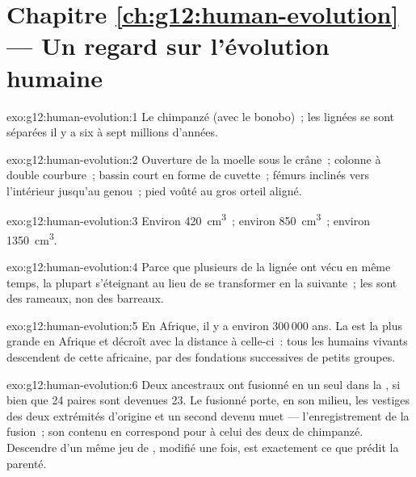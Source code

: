 \section*{Chapitre \ref{ch:g12:human-evolution} --- Un regard sur l'évolution humaine}

\begin{solution}{exo:g12:human-evolution:1}
Le chimpanzé (avec le bonobo)~; les lignées se sont séparées il y a
six à sept millions d'années.
\end{solution}

\begin{solution}{exo:g12:human-evolution:2}
Ouverture de la moelle sous le crâne~; colonne à double courbure~;
bassin court en forme de cuvette~; fémurs inclinés vers l'intérieur
jusqu'au genou~; pied voûté au gros orteil aligné.
\end{solution}

\begin{solution}{exo:g12:human-evolution:3}
Environ \qty{420}{cm^3}~; environ \qty{850}{cm^3}~; environ
\qty{1350}{cm^3}.
\end{solution}

\begin{solution}{exo:g12:human-evolution:4}
Parce que plusieurs  de la lignée ont vécu en même temps, la
plupart s'éteignant au lieu de se transformer en la suivante~; les
 sont des rameaux, non des barreaux.
\end{solution}

\begin{solution}{exo:g12:human-evolution:5}
En Afrique, il y a environ 300\,000 ans. La  est la
plus grande en Afrique et décroît avec la distance à celle-ci~: tous
les humains vivants descendent de cette  africaine, par des
fondations successives de petits groupes.
\end{solution}

\begin{solution}{exo:g12:human-evolution:6}
Deux  ancestraux ont fusionné en un seul dans la , si bien que 24 paires sont devenues 23. Le 
fusionné porte, en son milieu, les vestiges des deux extrémités
d'origine et un second  devenu muet --- l'enregistrement de
la fusion~; son contenu en  correspond  pour  à celui des
deux  de chimpanzé. Descendre d'un même jeu de ,
modifié une fois, est exactement ce que prédit la parenté.
\end{solution}

